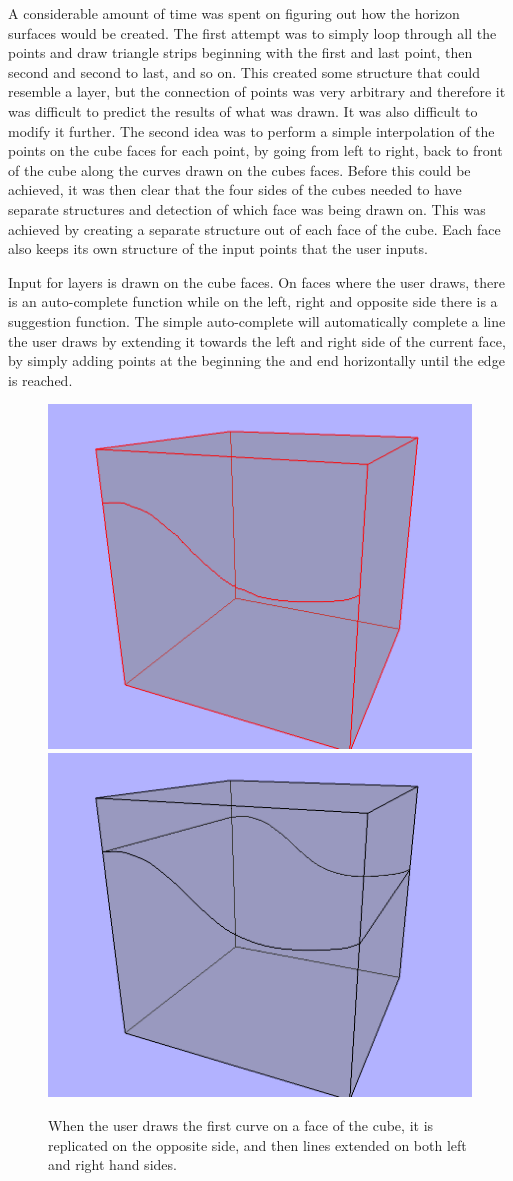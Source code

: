 \documentclass[a4paper,12pt]{report}
\begin{document}
A considerable amount of time was spent on figuring out how the horizon surfaces would be created. The first attempt was to simply loop through all the points and draw triangle strips beginning with the first and last point, then second and second to last, and so on. This created some structure that could resemble a layer, but the connection of points was very arbitrary and therefore it was difficult to predict the results of what was drawn. It was also difficult to modify it further. The second idea was to perform a simple interpolation of the points on the cube faces for each point, by going from left to right, back to front of the cube along the curves drawn on the cubes faces. Before this could be achieved, it was then clear that the four sides of the cubes needed to have separate structures and detection of which face was being drawn on. This was achieved by creating a separate structure out of each 
face of the cube. Each face also keeps its own structure of the input points that the user inputs.


Input for layers is drawn on the cube faces. On faces where the user draws, there is an auto-complete function while on the left, right and opposite side there is a suggestion function. The simple auto-complete will automatically complete a line the user draws by extending it towards the left and right side of the current face, by simply adding points at the beginning the and end horizontally until the edge is reached.

\begin{figure}
\includegraphics[width=.5\linewidth]{thesis/suggestion1.png}
\includegraphics[width=.5\linewidth]{thesis/suggestion2.png}
 \caption{When the user draws the first curve on a face of the cube, it is replicated on the opposite side, and then lines extended on both left and right hand sides.}
 \label{fig:suggest}
\end{figure}
\end{document}
